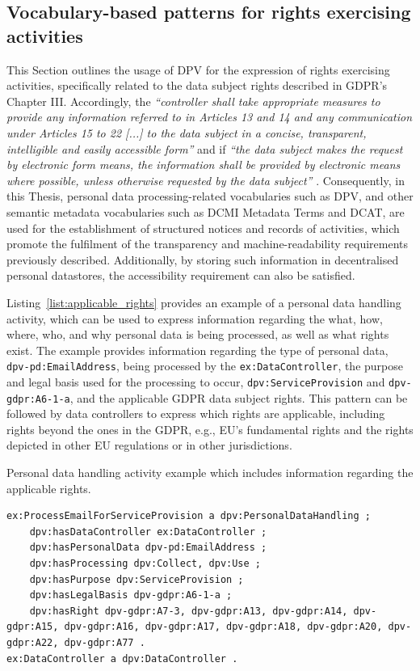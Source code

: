 \subsection{Vocabulary-based patterns for rights exercising activities}
\label{sec:rights_patterns}

This Section outlines the usage of DPV for the expression of rights exercising activities, specifically related to the data subject rights described in GDPR's Chapter III.
Accordingly, the \textit{``controller shall take appropriate measures to provide any information referred to in Articles 13 and 14 and any communication under Articles 15 to 22 [...] to the data subject in a concise, transparent, intelligible and easily accessible form''} and if \textit{``the data subject makes the request by electronic form means, the information shall be provided by electronic means where possible, unless otherwise requested by the data subject''} \citeyearpar{noauthor_regulation_2016}.
Consequently, in this Thesis, personal data processing-related vocabularies such as DPV, and other semantic metadata vocabularies such as DCMI Metadata Terms and DCAT, are used for the establishment of structured notices and records of activities, which promote the fulfilment of the transparency and machine-readability requirements previously described.
Additionally, by storing such information in decentralised personal datastores, the accessibility requirement can also be satisfied.

Listing~\ref{list:applicable_rights} provides an example of a personal data handling activity, which can be used to express information regarding the what, how, where, who, and why personal data is being processed, as well as what rights exist.
The example provides information regarding the type of personal data, \texttt{dpv-pd:EmailAddress}, being processed by the \texttt{ex:DataController}, the purpose and legal basis used for the processing to occur, \texttt{dpv:ServiceProvision} and \texttt{dpv-gdpr:A6-1-a}, and the applicable GDPR data subject rights.
This pattern can be followed by data controllers to express which rights are applicable, including rights beyond the ones in the GDPR, e.g., EU's fundamental rights and the rights depicted in other EU regulations or in other jurisdictions.

\begin{listing}[htp]
\caption{Personal data handling activity example which includes information regarding the applicable rights.}
\label{list:applicable_rights}
\begin{verbatim}
ex:ProcessEmailForServiceProvision a dpv:PersonalDataHandling ;
    dpv:hasDataController ex:DataController ;
    dpv:hasPersonalData dpv-pd:EmailAddress ;
    dpv:hasProcessing dpv:Collect, dpv:Use ;
    dpv:hasPurpose dpv:ServiceProvision ;
    dpv:hasLegalBasis dpv-gdpr:A6-1-a ;
    dpv:hasRight dpv-gdpr:A7-3, dpv-gdpr:A13, dpv-gdpr:A14, dpv-gdpr:A15, dpv-gdpr:A16, dpv-gdpr:A17, dpv-gdpr:A18, dpv-gdpr:A20, dpv-gdpr:A22, dpv-gdpr:A77 .
ex:DataController a dpv:DataController .
\end{verbatim}
\end{listing}

